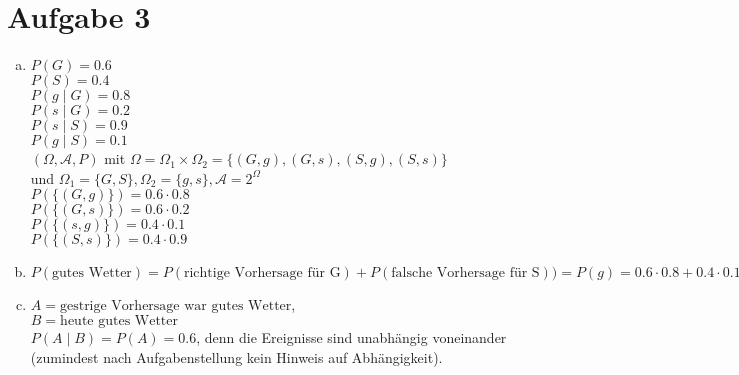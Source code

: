 \documentclass[10pt,a4paper]{article}
\begin{document}
\newpage

 \section*{Aufgabe 3}
  
  \begin{enumerate}[a)]
  
  \item
  $P(G) = 0.6$\\
  $P(S) = 0.4$\\
  $P(g \mid G) = 0.8$\\
  $P(s \mid G) = 0.2$\\
  $P(s \mid S) = 0.9$\\
  $P(g \mid S) = 0.1$\\
  $(\Omega, \mathcal{A}, P)$ mit $\Omega = \Omega _1 \times \Omega _2 = \{(G,g), (G,s), (S,g), (S,s)\}$\\
  und $\Omega _1 = \{G, S\}, \Omega _2 = \{g, s\}, \mathcal{A} = 2^\Omega$\\
  $P(\{(G,g)\}) = 0.6 \cdot 0.8$\\
  $P(\{(G,s)\}) = 0.6 \cdot 0.2$\\
  $P(\{(s,g)\}) = 0.4 \cdot 0.1$\\
  $P(\{(S,s)\}) = 0.4 \cdot 0.9$\\
  \item
  
  $P(\text{gutes Wetter}) = P(\text{richtige Vorhersage für G}) + P(\text{falsche Vorhersage für S})) = P(g) = 0.6 \cdot 0.8 + 0.4 \cdot 0.1 = 0.52$\\
  \item
  $A = \text{gestrige Vorhersage war gutes Wetter}$,\\$B = \text{heute gutes Wetter}$\\
  $P(A \mid B) = P(A) = 0.6$, denn die Ereignisse sind unabhängig voneinander (zumindest nach Aufgabenstellung kein Hinweis auf Abhängigkeit).
\end{enumerate}

\newpage
\end{document}
